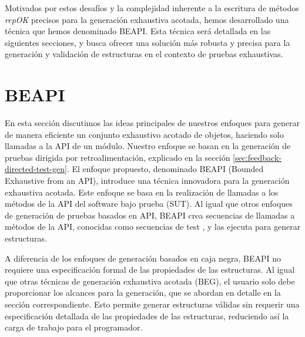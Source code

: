 Motivados por estos desafíos y la complejidad inherente a la escritura de métodos \emph{repOK} precisos para la generación exhaustiva acotada, hemos desarrollado una técnica que hemos denominado BEAPI. 
Esta técnica será detallada en las siguientes secciones, y busca ofrecer una solución más robusta y precisa para la generación y validación de estructuras en el contexto de pruebas exhaustivas.


\section[BEAPI]{BEAPI}
\label{sec:beapiIntro}

En esta sección discutimos las ideas principales de nuestros enfoques para generar de manera eficiente un conjunto exhaustivo acotado de objetos, haciendo solo llamadas a la API de un módulo. Nuestro enfoque se basan en la generación de pruebas dirigida por retroalimentación, explicado en la sección \ref{sec:feedback-directed-test-gen}.
El enfoque propuesto, denominado \textsf{BEAPI} (Bounded Exhaustive from an API), introduce una técnica innovadora para la generación exhaustiva acotada. Este enfoque se basa en la realización de llamadas a los métodos de la API del software bajo prueba (SUT). Al igual que otros enfoques de generación de pruebas basados en API, \textsf{BEAPI} crea secuencias de llamadas a métodos de la API, conocidas como secuencias de test \cite{Ammann16}, y las ejecuta para generar estructuras. 





A diferencia de los enfoques de generación basados en caja negra, \textsf{BEAPI} no requiere una especificación formal de las propiedades de las estructuras. Al igual que otras técnicas de generación exhaustiva acotada (BEG), el usuario solo debe proporcionar los alcances para la generación, que se abordan en detalle en la sección correspondiente.  Esto permite generar estructuras válidas sin requerir una especificación detallada de las propiedades de las estructuras, reduciendo así la carga de trabajo para el programador.

